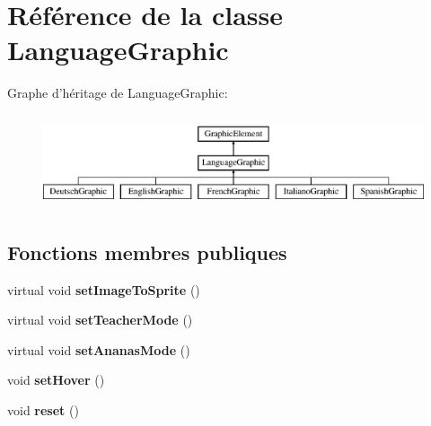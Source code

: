 \hypertarget{class_language_graphic}{\section{Référence de la classe Language\-Graphic}
\label{class_language_graphic}
}
Graphe d'héritage de Language\-Graphic\-:\begin{figure}[H]
\begin{center}
\leavevmode
\includegraphics[height=2.776860cm]{class_language_graphic}
\end{center}
\end{figure}
\subsection*{Fonctions membres publiques}
\begin{DoxyCompactItemize}
\item 
\hypertarget{class_language_graphic_af84e2a15f4ffff39b23ae9f271530e10}{virtual void {\bfseries set\-Image\-To\-Sprite} ()}\label{class_language_graphic_af84e2a15f4ffff39b23ae9f271530e10}

\item 
\hypertarget{class_language_graphic_a5d97e74fa17437b7e506afaafdbd037a}{virtual void {\bfseries set\-Teacher\-Mode} ()}\label{class_language_graphic_a5d97e74fa17437b7e506afaafdbd037a}

\item 
\hypertarget{class_language_graphic_a452acee7fc2e289a30913b622ae29965}{virtual void {\bfseries set\-Ananas\-Mode} ()}\label{class_language_graphic_a452acee7fc2e289a30913b622ae29965}

\item 
\hypertarget{class_language_graphic_ab5c752f8c3d223e2a456521f96c86d79}{void {\bfseries set\-Hover} ()}\label{class_language_graphic_ab5c752f8c3d223e2a456521f96c86d79}

\item 
\hypertarget{class_language_graphic_acca816079c11a5cdb1d3b4aeb44a5d46}{void {\bfseries reset} ()}\label{class_language_graphic_acca816079c11a5cdb1d3b4aeb44a5d46}

\end{DoxyCompactItemize}

